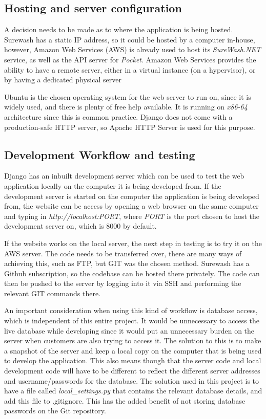     \subsection{Hosting and server configuration}
    A decision needs to be made as to where the application is being hosted. Surewash has a static IP address, so it could be hosted by a computer in-house, however, Amazon Web Services (AWS) is already used to host its {\slshape SureWash.NET} service, as well as the API server for {\slshape Pocket}. Amazon Web Services provides the ability to have a remote server, either in a virtual instance (on a hypervisor), or by having a dedicated physical server

    Ubuntu is the chosen operating system for the web server to run on, since it is widely used, and there is plenty of free help available. It is running on {\slshape x86-64} architecture since this is common practice. Django does not come with a production-safe HTTP server, so Apache HTTP Server is used for this purpose.

    \subsection{Development Workflow and testing}
    Django has an inbuilt development server which can be used to test the web application locally on the computer it is being developed from. If the development server is started on the computer the application is being developed from, the website can be access by opening a web browser on the same computer and typing in {\slshape http://localhost:PORT}, where {\slshape PORT} is the port chosen to host the development server on, which is 8000 by default.

    If the website works on the local server, the next step in testing is to try it on the AWS server. The code needs to be transferred over, there are many ways of achieving this, such as FTP, but GIT was the chosen method. Surewash has a Github subscription, so the codebase can be hosted there privately. The code can then be pushed to the server by logging into it via SSH and performing the relevant GIT commands there.

    An important consideration when using this kind of workflow is database access, which is independent of this entire project. It would be unnecessary to access the live database while developing since it would put an unnecessary burden on the server when customers are also trying to access it. The solution to this is to make a snapshot of the server and keep a local copy on the computer that is being used to develop the application. This also means though that the server code and local development code will have to be different to reflect the different server addresses and username/passwords for the database. The solution used in this project is to have a file called {\slshape local\_settings.py} that contains the relevant database details, and add this file to .gitignore. This has the added benefit of not storing database passwords on the Git repository.


